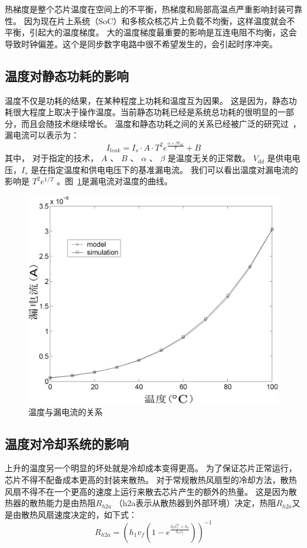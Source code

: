 热梯度是整个芯片温度在空间上的不平衡，热梯度和局部高温点严重影响封装可靠性。
因为现在片上系统（SoC）和多核众核芯片上负载不均衡，这样温度就会不平衡，引起大的温度梯度。
大的温度梯度最重要的影响是互连电阻不均衡，这会导致时钟偏差。这个是同步数字电路中很不希望发生的，会引起时序冲突。

\subsection{温度对静态功耗的影响}\label{sec:leakage}

温度不仅是功耗的结果，在某种程度上功耗和温度互为因果。
这是因为，静态功耗很大程度上取决于操作温度。当前静态功耗已经是系统总功耗的很明显的一部分，而且会随技术继续增长。
温度和静态功耗之间的关系已经被广泛的研究过~\cite{liao2005temperature}，漏电流可以表示为：
\begin{equation}
I_{leak} = I_s \cdot A \cdot T^2e^{\frac{\alpha + \beta V_{dd}}{T}}+B
\end{equation}
其中， 对于指定的技术， $A$ 、 $B$ 、  $\alpha$ 、 $\beta$ 是温度无关的正常数。
$V_{dd}$ 是供电电压，$I_s$ 是在指定温度和供电电压下的基准漏电流。
我们可以看出温度对漏电流的影响是 $T^2e^{1/T}$ 。图~\ref{fig:leakage}是漏电流对温度的曲线。
\begin{figure}
  \centering
    \includegraphics[width=0.7\columnwidth]{fig/leakage}
  \caption{温度与漏电流的关系\cite{zhang2003hotleakage}}\label{fig:leakage}
\end{figure}

\subsection{温度对冷却系统的影响}\label{sec:cooling}

上升的温度另一个明显的坏处就是冷却成本变得更高。
为了保证芯片正常运行，芯片不得不配备成本更高的封装来散热。
对于常规散热风扇型的冷却方法，散热风扇不得不在一个更高的速度上运行来散去芯片产生的额外的热量。
这是因为散热器的散热能力是由热阻$R_{h2a}$ （h2a表示从散热器到外部环境）决定，热阻$R_{h2a}$又是由散热风扇速度决定的，如下式：
\begin{equation}\label{eq:cooling}
R_{h2a} = (h_1v_f(1-e^{\frac{h_2v_f^{h_3}+h_4}{h_1v_f}}))^{-1}
\end{equation}

